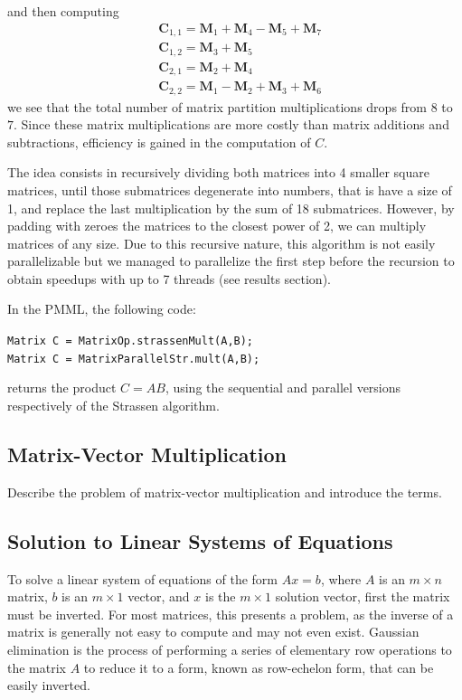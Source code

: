 \documentclass{dependencies/acm_proc_article-sp}
\begin{document}
and then computing 
\begin{align*}
&\mathbf{C}_{1,1} = \mathbf{M}_{1} + \mathbf{M}_{4} - \mathbf{M}_{5} + \mathbf{M}_{7}\\
&\mathbf{C}_{1,2} = \mathbf{M}_{3} + \mathbf{M}_{5}\\
&\mathbf{C}_{2,1} = \mathbf{M}_{2} + \mathbf{M}_{4}\\
&\mathbf{C}_{2,2} = \mathbf{M}_{1} - \mathbf{M}_{2} + \mathbf{M}_{3} + \mathbf{M}_{6}
\end{align*}
we see that the total number of matrix partition multiplications drops from $8$ to $7$. Since these matrix multiplications are more costly than matrix additions and subtractions, efficiency is gained in the computation of $C$.

The idea consists in recursively dividing both matrices into 4 smaller square matrices, until those submatrices degenerate into numbers, that is have a size of 1, and replace the last multiplication by the sum of 18 submatrices. However, by padding with zeroes the matrices to the closest power of 2, we can multiply matrices of any size. Due to this recursive nature, this algorithm is not easily parallelizable but we managed to parallelize the first step before the recursion to obtain speedups with up to 7 threads (see results section).

In the PMML, the following code:

{\tt Matrix C = MatrixOp.strassenMult(A,B);\\
Matrix C = MatrixParallelStr.mult(A,B);}

returns the product $C=AB$, using the sequential and parallel versions respectively of the Strassen algorithm. 

\subsection{Matrix-Vector Multiplication}

Describe the problem of matrix-vector multiplication and introduce the terms.

\subsection{Solution to Linear Systems of Equations}

To solve a linear system of equations of the form $Ax=b$, where $A$ is an $m\times n$ matrix, $b$ is an $m\times 1$ vector, and $x$ is the $m\times 1$ solution vector, first the matrix must be inverted. For most matrices, this presents a problem, as the inverse of a matrix is generally not easy to compute and may not even exist. Gaussian elimination is the process of performing a series of elementary row operations to the matrix $A$ to reduce it to a form, known as row-echelon form, that can be easily inverted.
\end{document}
